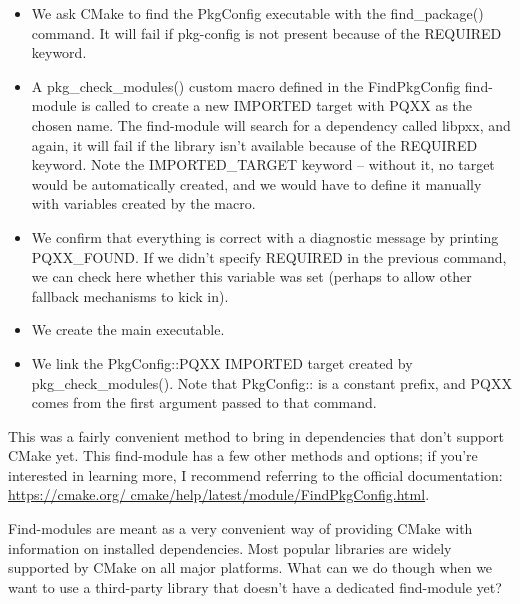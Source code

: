 \begin{itemize}
\item 
We ask CMake to find the PkgConfig executable with the find\_package() command. It will fail if pkg-config is not present because of the REQUIRED keyword.

\item 
A pkg\_check\_modules() custom macro defined in the FindPkgConfig find-module is called to create a new IMPORTED target with PQXX as the chosen name. The find-module will search for a dependency called libpxx, and again, it will fail if the library isn't available because of the REQUIRED keyword. Note the IMPORTED\_TARGET keyword – without it, no target would be automatically created, and we would have to define it manually with variables created by the macro.


\item 
We confirm that everything is correct with a diagnostic message by printing PQXX\_FOUND. If we didn't specify REQUIRED in the previous command, we can check here whether this variable was set (perhaps to allow other fallback mechanisms to kick in).

\item 
We create the main executable.

\item 
We link the PkgConfig::PQXX IMPORTED target created by pkg\_check\_modules(). Note that PkgConfig:: is a constant prefix, and PQXX comes from the first argument passed to that command.
\end{itemize}

This was a fairly convenient method to bring in dependencies that don't support CMake yet. This find-module has a few other methods and options; if you're interested in learning more, I recommend referring to the official documentation: \url{https://cmake.org/ cmake/help/latest/module/FindPkgConfig.html}.

Find-modules are meant as a very convenient way of providing CMake with information on installed dependencies. Most popular libraries are widely supported by CMake on all major platforms. What can we do though when we want to use a third-party library that doesn't have a dedicated find-module yet?



















